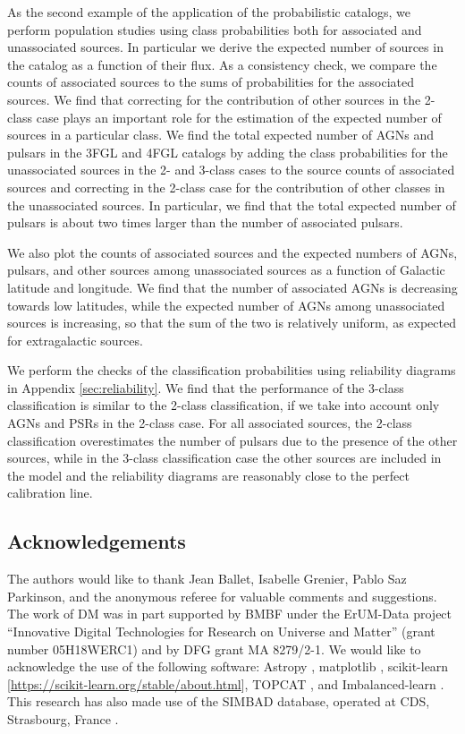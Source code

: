 As the second example of the application of the probabilistic catalogs, we perform population studies using class probabilities both for associated and unassociated sources.
In particular we derive the expected number of sources in the catalog as a function of their flux.
As a consistency check, we compare the counts of associated sources to the sums of probabilities for the associated sources.
We find that correcting for the contribution of other sources in the 2-class case plays an important role for the estimation of the expected number of sources in a particular class.
We find the total expected number of AGNs and pulsars in the 3FGL and 4FGL catalogs by adding the class probabilities for the unassociated sources in the 2- and 3-class cases to the source counts of associated sources and correcting in the 2-class case for the contribution of other classes in the unassociated sources.
In particular, we find that the total expected number of pulsars is about two times larger than the number of associated pulsars.

We also plot the counts of associated sources and the expected numbers of AGNs, pulsars, and other sources among unassociated sources
as a function of Galactic latitude and longitude.
We find that the number of associated AGNs is decreasing towards low latitudes, while the expected number of AGNs among unassociated sources is increasing, so that the sum of the two is relatively uniform, as expected for extragalactic sources.

We perform the checks of the classification probabilities using reliability diagrams in Appendix \ref{sec:reliability}. 
We find that the performance of the 3-class classification is similar to the 2-class classification, if we take into account only AGNs and PSRs in the 2-class case. For all associated sources, the 2-class classification overestimates the number of pulsars due to the presence of the
other sources, while in the 3-class classification case the other sources are included in the model and the reliability diagrams are reasonably close to the perfect calibration line.

\subsection*{Acknowledgements}

The authors would like to thank Jean Ballet, Isabelle Grenier, Pablo Saz Parkinson, and the anonymous referee for valuable comments and suggestions.
The work of DM was in part supported by BMBF under the ErUM-Data project ``Innovative Digital Technologies for Research on Universe and Matter'' (grant number 05H18WERC1) and by DFG grant MA 8279/2-1.
We would like to acknowledge the use of the following software:
Astropy \citep[\url{http://www.astropy.org},][]{2013A&A...558A..33A}, 
matplotlib \citep{Hunter:2007}, 
scikit-learn [\url{https://scikit-learn.org/stable/about.html}], 
TOPCAT \citep{2005ASPC..347...29T}, and Imbalanced-learn \cite{JMLR:v18:16-365}.
This research has also made use of the SIMBAD database,
operated at CDS, Strasbourg, France \citep{2000A&AS..143....9W}.